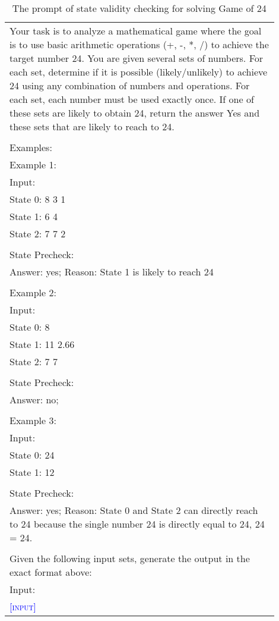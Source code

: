 \begin{table*}[ht]
\small
\centering
\caption{The prompt of state validity checking for solving Game of 24}
\begin{tabular}{p{0.9\linewidth}} \toprule
Your task is to analyze a mathematical game where the goal is to use basic arithmetic operations (+, -, *, /) to achieve the target number 24. You are given several sets of numbers. For each set, determine if it is possible (likely/unlikely) to achieve 24 using any combination of numbers and operations. For each set, each number must be used exactly once. If one of these sets are likely to obtain 24, return the answer Yes and these sets that are likely to reach to 24.\\
\\
Examples:\\
Example 1:\\
Input:\\
State 0: 8 3 1\\
State 1: 6 4\\
State 2: 7 7 2\\
\\
State Precheck:\\
Answer: yes; Reason: State 1 is likely to reach 24\\
\\
Example 2:\\
Input:\\
State 0: 8 \\
State 1: 11 2.66\\
State 2: 7 7 \\
\\
State Precheck:\\
Answer: no;\\
\\
Example 3:\\
Input:\\
State 0: 24\\
State 1: 12\\
\\
State Precheck:\\
Answer: yes; Reason: State 0 and State 2 can directly reach to 24 because the single number 24 is directly equal to 24, 24 = 24.\\
\\
Given the following input sets, generate the output in the exact format above: \\
Input:\\
\textcolor{blue}{\textsc{[input]}}
\\ \bottomrule
\end{tabular}
\label{tab:state_validity_checking_prompt}
\end{table*}


